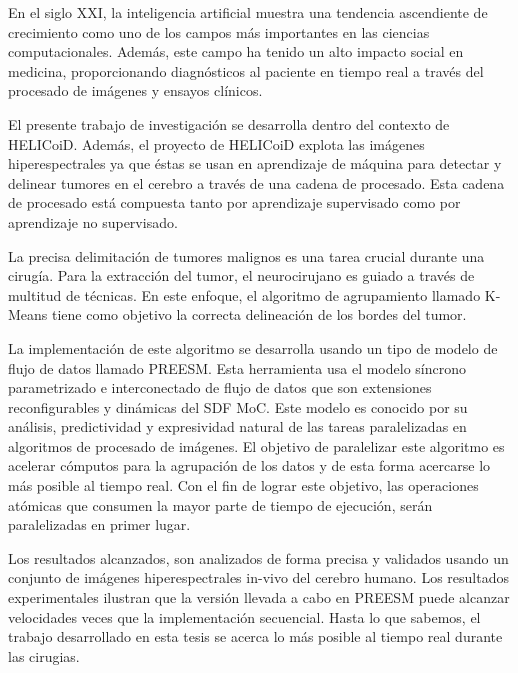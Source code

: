 En el siglo XXI, la inteligencia artificial muestra una tendencia ascendiente de crecimiento como uno de los campos más importantes en las ciencias computacionales. Además, este campo ha tenido un alto impacto social en medicina, proporcionando diagnósticos al paciente en tiempo real a través del procesado de imágenes y ensayos clínicos.

	El presente trabajo de investigación se desarrolla dentro del contexto de HELICoiD. Además, el proyecto de HELICoiD explota las imágenes hiperespectrales ya que éstas se usan en aprendizaje de máquina para detectar y delinear tumores en el cerebro a través de una cadena de procesado. Esta cadena de procesado está compuesta tanto por aprendizaje supervisado como por aprendizaje no supervisado.
	
	La precisa delimitación de tumores malignos es una tarea crucial durante una cirugía. Para la extracción del tumor, el neurocirujano es guiado a través de multitud de técnicas. En este enfoque, el algoritmo de agrupamiento llamado K-Means tiene como objetivo la correcta delineación de los bordes del tumor.
	
	La implementación de este algoritmo se desarrolla usando un tipo de modelo de flujo de datos llamado PREESM. Esta herramienta usa el modelo síncrono parametrizado e interconectado de flujo de datos que son extensiones reconfigurables y dinámicas del SDF MoC. Este modelo es conocido por su análisis, predictividad y expresividad natural de las tareas paralelizadas en algoritmos de procesado de imágenes. El objetivo de paralelizar este algoritmo es acelerar cómputos para la agrupación de los datos y de esta forma acercarse lo más posible al tiempo real. Con el fin de lograr este objetivo, las operaciones atómicas que consumen la mayor parte de tiempo de ejecución, serán paralelizadas en primer lugar.
	
	Los resultados alcanzados, son analizados de forma precisa y validados usando un conjunto de imágenes hiperespectrales in-vivo del cerebro humano. Los resultados experimentales ilustran que la versión llevada a cabo en PREESM puede alcanzar velocidades veces que la implementación secuencial. Hasta lo que sabemos, el trabajo desarrollado en esta tesis se acerca lo más posible al tiempo real durante las cirugias.
	
	
	
	
	
